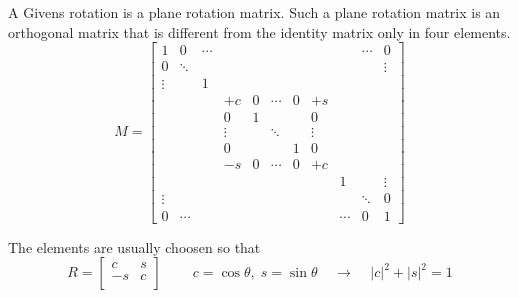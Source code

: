 A Givens rotation is a plane rotation matrix.  Such a plane rotation
matrix is an orthogonal matrix that is different from the identity
matrix only in four elements.
\begin{equation}
M =
\left[
\begin{array}{ccccccccccc}
1 & 0 & \cdots &  &  &  &  &  &  & \cdots & 0\\
0 & \ddots &  &  &  &  &  &  &  &  & \vdots\\
\vdots &  & 1 &  &  &  &  &  &  &  & \\
 &  &  & +c & 0 & \cdots & 0 & +s &  &  & \\
 &  &  & 0 & 1 &  &  & 0 &  &  & \\
 &  &  & \vdots &  & \ddots &  & \vdots &  &  & \\
 &  &  & 0 &  &  & 1 & 0 &  &  & \\
 &  &  & -s & 0 & \cdots & 0 & +c &  &  & \\
 &  &  &  &  &  &  &  & 1 &  & \vdots\\
\vdots &  &  &  &  &  &  &  &  & \ddots & 0\\
0 & \cdots &  &  &  &  &  &  & \cdots & 0 & 1
\end{array}
\right]
\end{equation}

The elements are usually choosen so that
\begin{equation}
\label{eq:givenscond}
R =
\left[\begin{array}{rl}
c & s\\
-s & c\\
\end{array}\right]
\;\;\;\;  \;\;\;\;
c = \cos{\theta},\; s = \sin{\theta}
\;\;\;\; \rightarrow \;\;\;\;
\left|c\right|^2 + \left|s\right|^2 = 1
\end{equation}

